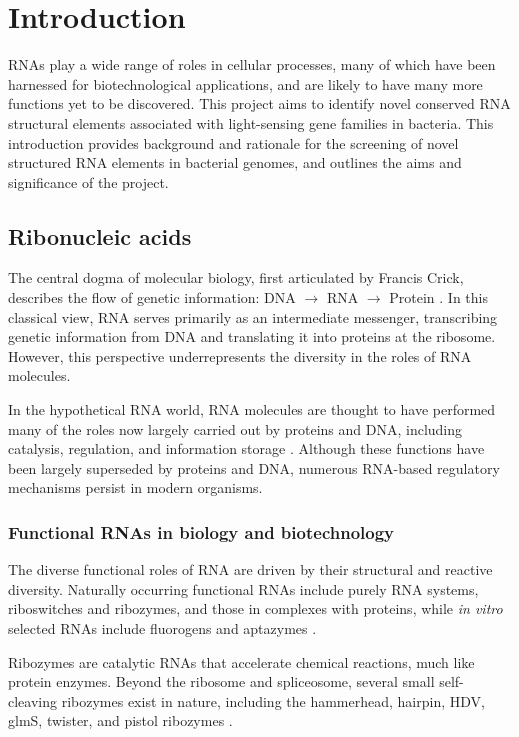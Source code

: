 \chapter{Introduction}

RNAs play a wide range of roles in cellular processes, many of which have been harnessed for biotechnological applications, and are likely to have many more functions yet to be discovered.
This project aims to identify novel conserved RNA structural elements associated with light-sensing gene families in bacteria.
This introduction provides background and rationale for the screening of novel structured RNA elements in bacterial genomes, and outlines the aims and significance of the project.

\section{Ribonucleic acids}

The central dogma of molecular biology, first articulated by Francis Crick, describes the flow of genetic information: DNA $\rightarrow$ RNA $\rightarrow$ Protein \citep{Crick1970}.
In this classical view, RNA serves primarily as an intermediate messenger, transcribing genetic information from DNA and translating it into proteins at the ribosome.
However, this perspective underrepresents the diversity in the roles of RNA molecules.

In the hypothetical RNA world, RNA molecules are thought to have performed many of the roles now largely carried out by proteins and DNA, including catalysis, regulation, and information storage \citep{Kruger1982, Guerrier-Takada1983, Gilbert1986, Breaker2012}.
Although these functions have been largely superseded by proteins and DNA, numerous RNA-based regulatory mechanisms persist in modern organisms.

\subsection{Functional RNAs in biology and biotechnology}

The diverse functional roles of RNA are driven by their structural and reactive diversity. 
Naturally occurring functional RNAs include purely RNA systems, riboswitches and ribozymes, and those in complexes with proteins, while \emph{in vitro} selected RNAs include ﬂuorogens and aptazymes \citep{Micura2020}.

Ribozymes are catalytic RNAs that accelerate chemical reactions, much like protein enzymes.
Beyond the ribosome and spliceosome, several small self-cleaving ribozymes exist in nature, including the hammerhead, hairpin, \ac{HDV}, glmS, twister, and pistol ribozymes \citep{Roth2014, Weinberg2015, Micura2020}. 

